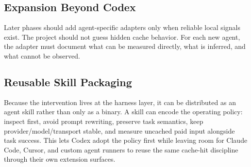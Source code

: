 \subsection{Expansion Beyond Codex}

Later phases should add agent-specific adapters only when reliable local signals exist. The project should not guess hidden cache behavior. For each new agent, the adapter must document what can be measured directly, what is inferred, and what cannot be observed.

\subsection{Reusable Skill Packaging}

Because the intervention lives at the harness layer, it can be distributed as an agent skill rather than only as a binary. A skill can encode the operating policy: inspect first, avoid prompt rewriting, preserve task semantics, keep provider/model/transport stable, and measure uncached paid input alongside task success. This lets Codex adopt the policy first while leaving room for Claude Code, Cursor, and custom agent runners to reuse the same cache-hit discipline through their own extension surfaces.

